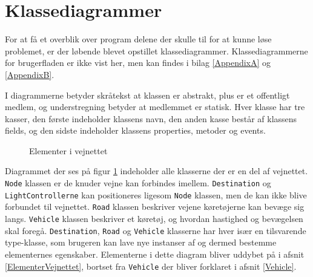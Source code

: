 \section{Klassediagrammer}\label{Klassediagrammer}
%
For at få et overblik over program delene der skulle til for at kunne løse problemet, er der løbende blevet opstillet klassediagrammer. Klassediagrammerne for brugerfladen er ikke vist her, men kan findes i bilag \ref{AppendixA} og \ref{AppendixB}.

\vspace{5mm}

I diagrammerne betyder skråtekst at klassen er abstrakt, plus er et offentligt medlem, og understregning betyder at medlemmet er statisk. Hver klasse har tre kasser, den første indeholder klassens navn, den anden kasse består af klassens fields, og den sidste indeholder klassens properties, metoder og events.

\begin{figure}[H]
    \centering
    \caption{Elementer i vejnettet}
    \label{kdVejElementer}
\end{figure}

Diagrammet der ses på figur \ref{kdVejElementer} indeholder alle klasserne der er en del af vejnettet. \texttt{Node} klassen er de knuder vejne kan forbindes imellem. \texttt{Destination} og \texttt{LightControllerne} kan positioneres ligesom \texttt{Node} klassen, men de kan ikke blive forbundet til vejnettet. \texttt{Road} klassen beskriver vejene køretøjerne kan bevæge sig langs. \texttt{Vehicle} klassen beskriver et køretøj, og hvordan hastighed og bevægelsen skal foregå. \texttt{Destination}, \texttt{Road} og \texttt{Vehicle} klasserne har hver især en tilsvarende type-klasse, som brugeren kan lave nye instanser af og dermed bestemme elementernes egenskaber. Elementerne i dette diagram bliver uddybet på i afsnit \ref{ElementerVejnettet}, bortset fra \texttt{Vehicle} der bliver forklaret i afsnit \ref{Vehicle}.


